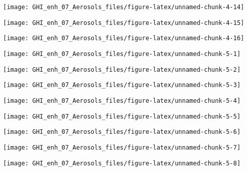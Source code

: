 \documentclass[
  10pt,
  a4paper,oneside]{article}
\begin{document}
\begin{center}\texttt{[image: GHI\_enh\_07\_Aerosols\_files/figure-latex/unnamed-chunk-4-14]} \end{center}

\begin{center}\texttt{[image: GHI\_enh\_07\_Aerosols\_files/figure-latex/unnamed-chunk-4-15]} \end{center}

\begin{center}\texttt{[image: GHI\_enh\_07\_Aerosols\_files/figure-latex/unnamed-chunk-4-16]} \end{center}

\begin{center}\texttt{[image: GHI\_enh\_07\_Aerosols\_files/figure-latex/unnamed-chunk-5-1]} \end{center}

\begin{center}\texttt{[image: GHI\_enh\_07\_Aerosols\_files/figure-latex/unnamed-chunk-5-2]} \end{center}

\begin{center}\texttt{[image: GHI\_enh\_07\_Aerosols\_files/figure-latex/unnamed-chunk-5-3]} \end{center}

\begin{center}\texttt{[image: GHI\_enh\_07\_Aerosols\_files/figure-latex/unnamed-chunk-5-4]} \end{center}

\begin{center}\texttt{[image: GHI\_enh\_07\_Aerosols\_files/figure-latex/unnamed-chunk-5-5]} \end{center}

\begin{center}\texttt{[image: GHI\_enh\_07\_Aerosols\_files/figure-latex/unnamed-chunk-5-6]} \end{center}

\begin{center}\texttt{[image: GHI\_enh\_07\_Aerosols\_files/figure-latex/unnamed-chunk-5-7]} \end{center}

\begin{center}\texttt{[image: GHI\_enh\_07\_Aerosols\_files/figure-latex/unnamed-chunk-5-8]} \end{center}
\end{document}
